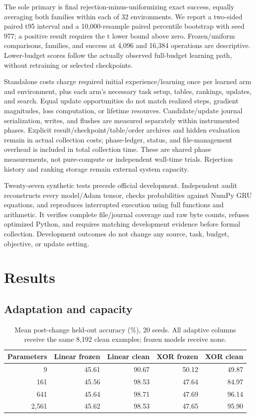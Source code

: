 \documentclass[11pt]{article}
\begin{document}
The sole primary is final rejection-minus-uniformizing exact success,
equally averaging both families within each of 32 environments. We report a
two-sided paired t95 interval and a 10,000-resample paired percentile bootstrap
with seed 977; a positive result requires the t lower bound above zero.
Frozen/uniform comparisons, families, and success at 4,096 and 16,384
operations are descriptive. Lower-budget scores follow the actually observed
full-budget learning path, without retraining or selected checkpoints.

Standalone costs charge required initial experience/learning once per learned
arm and environment, plus each arm's necessary task setup, tables, rankings,
updates, and search. Equal update opportunities do not match realized steps,
gradient magnitudes, loss computation, or lifetime resources. Candidate/update
journal serialization, writes, and flushes are measured separately within
instrumented phases. Explicit result/checkpoint/table/order archives and
hidden evaluation remain in actual collection costs; phase-ledger, status,
and file-management overhead is included in total collection time. These are
shared phase measurements, not pure-compute or independent wall-time trials.
Rejection history and ranking storage remain external system capacity.

Twenty-seven synthetic tests precede official development. Independent audit
reconstructs every model/Adam tensor, checks probabilities against NumPy GRU
equations, and reproduces interrupted execution using full functions and
arithmetic. It verifies complete file/journal coverage and raw byte counts,
refuses optimized Python, and requires matching development evidence before
formal collection. Development outcomes do not change any source, task,
budget, objective, or update setting.

\newpage
\section{Results}
\subsection{Adaptation and capacity}
\begin{table}[ht]
\centering
\caption{Mean post-change held-out accuracy (\%), 20 seeds. All adaptive
columns receive the same 8,192 clean examples; frozen models receive none.}
\begin{tabular}{r r r r r}
\toprule
Parameters & Linear frozen & Linear clean & XOR frozen & XOR clean\\
\midrule
9 & 45.61 & 90.67 & 50.12 & 49.87\\
161 & 45.56 & 98.53 & 47.64 & 84.97\\
641 & 45.64 & 98.71 & 47.69 & 96.14\\
2,561 & 45.62 & 98.53 & 47.65 & 95.90\\
\bottomrule
\end{tabular}
\end{table}
\end{document}
